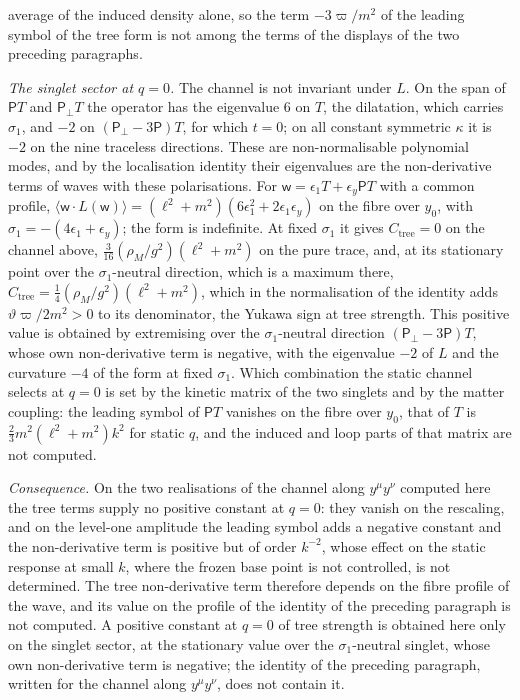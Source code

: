 average of the induced density alone, so the term \(-3\varpi/m^2\) of the leading symbol of the tree form is not among the terms of the displays of the two preceding paragraphs.

\emph{The singlet sector at \(q=0\).} The channel is not invariant under \(L\). On the span of \(\mathsf PT\) and \(\mathsf P_\perp T\) the operator has the eigenvalue \(6\) on \(T\), the dilatation, which carries \(\sigma_1\), and \(-2\) on \((\mathsf P_\perp-3\mathsf P)T\), for which \(t=0\); on all constant symmetric \(\kappa\) it is \(-2\) on the nine traceless directions. These are non-normalisable polynomial modes, and by the localisation identity their eigenvalues are the non-derivative terms of waves with these polarisations. For \(\mathsf w=\epsilon_1T+\epsilon_y\mathsf PT\) with a common profile, \(\langle\mathsf w\cdot L(\mathsf w)\rangle=(\ell^2+m^2)(6\epsilon_1^2+2\epsilon_1\epsilon_y)\) on the fibre over \(y_0\), with \(\sigma_1=-(4\epsilon_1+\epsilon_y)\); the form is indefinite. At fixed \(\sigma_1\) it gives \(C_{\mathrm{tree}}=0\) on the channel above, \(\tfrac3{16}(\rho_M/g^2)(\ell^2+m^2)\) on the pure trace, and, at its stationary point over the \(\sigma_1\)-neutral direction, which is a maximum there, \(C_{\mathrm{tree}}=\tfrac14(\rho_M/g^2)(\ell^2+m^2)\), which in the normalisation of the identity adds \(\vartheta\varpi/2m^2>0\) to its denominator, the Yukawa sign at tree strength. This positive value is obtained by extremising over the \(\sigma_1\)-neutral direction \((\mathsf P_\perp-3\mathsf P)T\), whose own non-derivative term is negative, with the eigenvalue \(-2\) of \(L\) and the curvature \(-4\) of the form at fixed \(\sigma_1\). Which combination the static channel selects at \(q=0\) is set by the kinetic matrix of the two singlets and by the matter coupling: the leading symbol of \(\mathsf PT\) vanishes on the fibre over \(y_0\), that of \(T\) is \(\tfrac23m^2(\ell^2+m^2)k^2\) for static \(q\), and the induced and loop parts of that matrix are not computed.

\emph{Consequence.} On the two realisations of the channel along \(y^\mu y^\nu\) computed here the tree terms supply no positive constant at \(q=0\): they vanish on the rescaling, and on the level-one amplitude the leading symbol adds a negative constant and the non-derivative term is positive but of order \(k^{-2}\), whose effect on the static response at small \(k\), where the frozen base point is not controlled, is not determined. The tree non-derivative term therefore depends on the fibre profile of the wave, and its value on the profile of the identity of the preceding paragraph is not computed. A positive constant at \(q=0\) of tree strength is obtained here only on the singlet sector, at the stationary value over the \(\sigma_1\)-neutral singlet, whose own non-derivative term is negative; the identity of the preceding paragraph, written for the channel along \(y^\mu y^\nu\), does not contain it.


